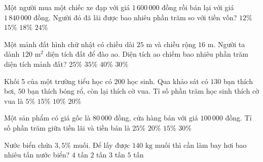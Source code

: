 \begin{ex} %
Một người mua một chiếc xe đạp với giá $1\,600\,000$ đồng rồi bán lại với giá $1\,840\,000$ đồng. Người đó đã lãi được bao nhiêu phần trăm so với tiền vốn?
\choice
{$12\%$}
{\True $15\%$}
{$18\%$}
{$24\%$}
\end{ex}

\begin{ex} %
Một mảnh đất hình chữ nhật có chiều dài $25\text{ m}$ và chiều rộng $16\text{ m}$. Người ta dành $120\text{ m}^2$ diện tích đất để đào ao. Diện tích ao chiếm bao nhiêu phần trăm diện tích mảnh đất?
\choice
{$25\%$}
{$35\%$}
{$40\%$}
{\True $30\%$}
\end{ex}

\begin{ex} %
Khối 5 của một trường tiểu học có $200$ học sinh. Qua khảo sát có $130$ bạn thích bơi, $50$ bạn thích bóng rổ, còn lại thích cờ vua. Tỉ số phần trăm học sinh thích cờ vua là
\choice
{$5\%$}
{$15\%$}
{\True $10\%$}
{$20\%$}
\end{ex}

\begin{ex} %
Một sản phẩm có giá gốc là $80\,000$ đồng, cửa hàng bán với giá $100\,000$ đồng. Tỉ số phần trăm giữa tiền lãi và tiền bán là
\choice
{$25\%$}
{\True $20\%$}
{$15\%$}
{$30\%$}
\end{ex}

\begin{ex} %
Nước biển chứa $3{,}5\%$ muối. Để lấy được $140\text{ kg}$ muối thì cần làm bay hơi bao nhiêu tấn nước biển?
\choice
{\True $4$ tấn}
{$2$ tấn}
{$3$ tấn}
{$5$ tấn}
\end{ex}

